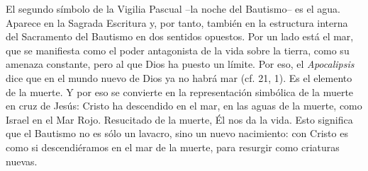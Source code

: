 			\begin{body}El segundo símbolo de la Vigilia Pascual –la noche del Bautismo– es el agua. Aparece en la Sagrada Escritura y, por tanto, también en la estructura interna del Sacramento del Bautismo en dos sentidos opuestos. Por un lado está el mar, que se manifiesta como el poder antagonista de la vida sobre la tierra, como su amenaza constante, pero al que Dios ha puesto un límite. Por eso, el \textit{Apocalipsis} dice que en el mundo nuevo de Dios ya no habrá mar (cf. 21, 1). Es el elemento de la muerte. Y por eso se convierte en la representación simbólica de la muerte en cruz de Jesús: Cristo ha descendido en el mar, en las aguas de la muerte, como Israel en el Mar Rojo. Resucitado de la muerte, Él nos da la vida. Esto significa que el Bautismo no es sólo un lavacro, sino un nuevo nacimiento: con Cristo es como si descendiéramos en el mar de la muerte, para resurgir como criaturas nuevas.\end{body}
			
